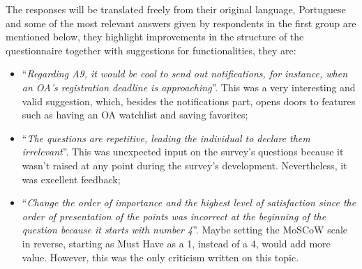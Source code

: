 The responses will be translated freely from their original language, Portuguese and some of the most relevant answers given by respondents in the first group are mentioned below, they highlight improvements in the structure of the questionnaire together with suggestions for functionalities, they are:
\begin{itemize}
  \item  ``\textit{Regarding A9, it would be cool to send out notifications, for instance, when an \ac{OA}'s registration deadline is approaching}''. This was a very interesting and valid suggestion, which, besides the notifications part, opens doors to features such as having an \ac{OA} watchlist and saving favorites;
  \item ``\textit{The questions are repetitive, leading the individual to declare them irrelevant}''. This was unexpected input on the survey's questions because it wasn't raised at any point during the survey's development. Nevertheless, it was excellent feedback;
  \item ``\textit{Change the order of importance and the highest level of satisfaction since the order of presentation of the points was incorrect at the beginning of the question because it starts with number 4}''. Maybe setting the MoSCoW scale in reverse, starting as Must Have as a 1, instead of a 4, would add more value. However, this was the only criticism written on this topic.
\end{itemize}

